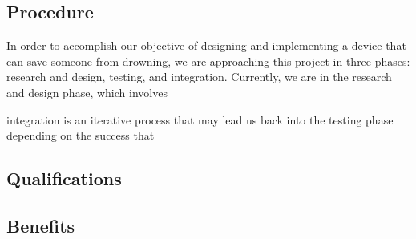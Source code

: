 \documentclass[11pt]{article}
\begin{document}
\subsection*{Procedure}

In order to accomplish our objective of designing and implementing a device that can save someone from drowning, we are approaching this project in three phases: research and design, testing, and integration. Currently, we are in the research and design phase, which involves 


integration is an iterative process that may lead us back into the testing phase depending on the success that 

\subsection*{Qualifications}

\subsection*{Benefits}
\end{document}
